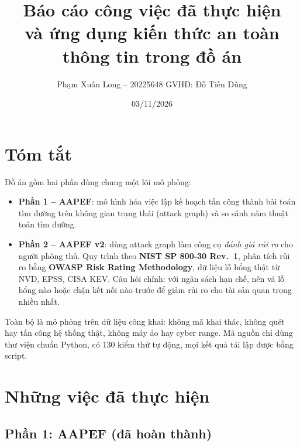 \documentclass[11pt,a4paper]{article}
\title{\textbf{Báo cáo công việc đã thực hiện}\\[2pt]
\large và ứng dụng kiến thức an toàn thông tin trong đồ án}
\author{Phạm Xuân Long -- 20225648 \quad GVHD: Đỗ Tiến Dũng}
\date{03/11/2026}
\begin{document}
\maketitle
\vspace{-0.8cm}

\section{Tóm tắt}

Đồ án gồm hai phần dùng chung một lõi mô phỏng:
\begin{itemize}
  \item \textbf{Phần 1 -- AAPEF}: mô hình hóa việc lập kế hoạch tấn công thành bài toán tìm đường trên không gian trạng thái (attack graph) và so sánh năm thuật toán tìm đường.
  \item \textbf{Phần 2 -- AAPEF v2}: dùng attack graph làm công cụ \emph{đánh giá rủi ro} cho người phòng thủ. Quy trình theo \textbf{NIST SP 800-30 Rev.~1}, phân tích rủi ro bằng \textbf{OWASP Risk Rating Methodology}, dữ liệu lỗ hổng thật từ NVD, EPSS, CISA KEV. Câu hỏi chính: với ngân sách hạn chế, nên vá lỗ hổng nào hoặc chặn kết nối nào trước để giảm rủi ro cho tài sản quan trọng nhiều nhất.
\end{itemize}

Toàn bộ là mô phỏng trên dữ liệu công khai: không mã khai thác, không quét hay tấn công hệ thống thật, không máy ảo hay cyber range. Mã nguồn chỉ dùng thư viện chuẩn Python, có 130 kiểm thử tự động, mọi kết quả tái lập được bằng script.

\section{Những việc đã thực hiện}

\subsection{Phần 1: AAPEF (đã hoàn thành)}
\end{document}
